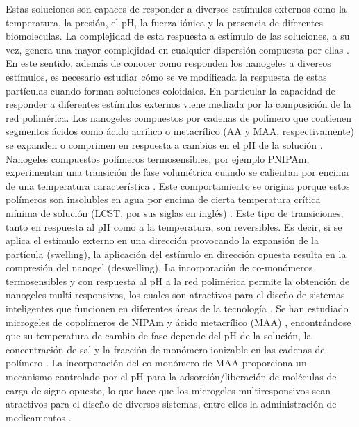 	Estas soluciones son capaces de responder a diversos est\'imulos externos como la temperatura, la presi\'on, el pH, la fuerza i\'onica y la presencia de diferentes biomoleculas.
	La complejidad de esta respuesta a est\'imulo de las soluciones, a su vez, genera una mayor complejidad en cualquier dispersi\'on compuesta por ellas \cite{lyon2012polymer}.
	En este sentido, adem\'as de conocer como responden los nanogeles a diversos est\'imulos, es necesario estudiar c\'omo se ve modificada la respuesta de estas part\'iculas cuando forman soluciones coloidales. 
	En particular la  capacidad de responder a diferentes est\'imulos externos viene mediada por la composici\'on de la red polim\'erica. Los nanogeles compuestos por cadenas de pol\'imero que contienen segmentos \'acidos como \'acido acr\'ilico o metacr\'ilico (AA y MAA, respectivamente) se expanden o comprimen en respuesta a cambios en el pH de la soluci\'on \cite{snowden1996colloidal, Zhou1998}. Nanogeles compuestos pol\'imeros termosensibles, por ejemplo PNIPAm, experimentan una transici\'on de fase volum\'etrica cuando se calientan por encima de una temperatura caracter\'istica \cite{Pelton1986, Pelton2000}. Este comportamiento se origina porque estos pol\'imeros son insolubles en agua por encima de cierta temperatura cr\'itica m\'inima de soluci\'on (LCST, por sus siglas en ingl\'es) \cite{Kawaguchi2020}.
	Este tipo de  transiciones, tanto en respuesta al pH como a la temperatura, son reversibles. Es decir, si se aplica el est\'imulo externo en una direcci\'on provocando la expansi\'on de la part\'icula (swelling), la aplicaci\'on del est\'imulo en direcci\'on opuesta resulta en la compresi\'on del nanogel (deswelling).
	La incorporaci\'on de co-mon\'omeros termosensibles y con respuesta al pH a la red polim\'erica permite la obtenci\'on de nanogeles multi-responsivos, los cuales son atractivos para el dise\~no de sistemas inteligentes que funcionen en diferentes \'areas de la tecnolog\'ia \cite{plamper2017functional}. Se han estudiado microgeles de copol\'imeros de NIPAm y \'acido metacr\'ilico (MAA) \cite{Dowding2000, Hoare2004, Giussi2015}, encontr\'andose que su temperatura de cambio de fase depende del pH de la soluci\'on, la concentraci\'on de sal y la fracci\'on de mon\'omero ionizable en las cadenas de pol\'imero \cite{Morris1997, Jones2000, Hoare2004, Bradley2005, Lee2008, Wong2009, Hamzavi2016}. La incorporaci\'on del co-mon\'omero de MAA proporciona un mecanismo controlado por el pH para la adsorci\'on/liberaci\'on de mol\'eculas de carga de signo opuesto, lo que hace que los microgeles multiresponsivos sean atractivos para el dise\~no de diversos sistemas, entre ellos la administraci\'on de medicamentos \cite{Liu2017}.
